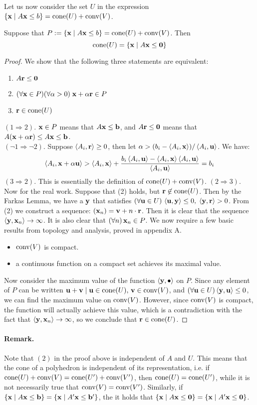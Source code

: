 Let us now consider the set $U$ in the expression $\HP{A}{b} = \cone(U) + \conv(V)$.
\begin{Prop}{\label{prop:ultz}
  Suppose that $P := \HP{A}{b} = \cone(U) + \conv(V)$.  Then
  \[ \cone(U) = \HC{A} \]
} \end{Prop}
\begin{proof}
We show that the following three statements are equivalent:
\begin{enumerate}
  \item $A\r\leq\0$
  \item $(\forall \x\in P)(\forall \alpha > 0)\;\x + \alpha\r \in P$
  \item $\r \in \cone(U)$
\end{enumerate}
$(1 \Rightarrow 2)$. $\x\in P$ means that $A\x\leq\b$, and $A\r\leq\0$ means that $A(\x+\alpha\r) \leq A\x \leq \b$.\\
$(\neg 1 \Rightarrow \neg 2)$.  Suppose $\ip{A_i}{\r} \geq 0$, then let $\alpha > (b_i - \ip{A_i}{\x})/\ip{A_i}{\u}$.  We have:
  \[ \ip{A_i}{\x + \alpha\u} > \ip{A_i}{\x} + 
          \frac{b_i\ip{A_i}{\u} - \ip{A_i}{\x}\ip{A_i}{\u}}{\ip{A_i}{\u}} = b_i \]
$(3 \Rightarrow 2)$.  This is essentially the definition of $\cone(U) + \conv(V)$.
$(2 \Rightarrow 3)$.  Now for the real work.  Suppose that (2) holds, but $\r\not\in\cone(U)$.  Then by the Farkas Lemma, we have a $\y$ that satisfies $(\forall \u\in U)\,\ip{\u}{\y}\leq 0,\; \ip{\y}{\r} > 0$.  From (2) we construct a sequence: $(\x_n) = \v+n\cdot\r$.  Then it is clear that the sequence $\ip{\y}{\x_n} \to \infty$.  It is also clear that $(\forall n)\,\x_n \in P$.  We now require a few basic results from topology and analysis, proved in appendix A.
\begin{itemize}
  \item $\conv(V)$ is compact.
  \item a continuous function on a compact set achieves its maximal value.
\end{itemize}
Now consider the maximum value of the function $\ip{\y}{\bullet}$ on $P$.  Since any element of $P$ can be written $\u + \v \st \u\in\cone(U),\,\v\in\conv(V)$, and $(\forall\u\in U) \ip{\y}{\u} \leq 0$, we can find the maximum value on $\conv(V)$.  However, since $\conv(V)$ is compact, the function will actually achieve this value, which is a contradiction with the fact that $\ip{\y}{\x_n} \to \infty$, so we conclude that $\r\in\cone(U)$.
\end{proof}

\paragraph{Remark.}  Note that $(2)$ in the proof above is independent of $A$ and $U$.  This means that the cone of a polyhedron is independent of its representation, i.e. if $\cone(U) + \conv(V) = \cone(U') + \conv(V')$, then $\cone(U) = \cone(U')$, while it is not necessarily true that $\conv(V) = \conv(V')$.  Similarly, if $\HP{A}{\b} = \HP{A'}{\b'}$, the it holds that $\HC{A} = \HC{A'}$.\\

